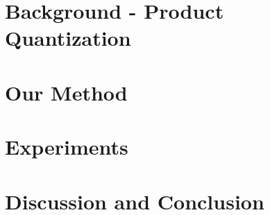 \documentclass{article}  %
\begin{document}
\section{Background - Product Quantization} \label{sec:background}
\vspace{-.5mm}



\vspace{-3mm}
\section{Our Method} \label{sec:method}
\vspace{-.5mm}



\section{Experiments} \label{sec:results}



\section{Discussion and Conclusion} \label{sec:limitations}



\end{document}
